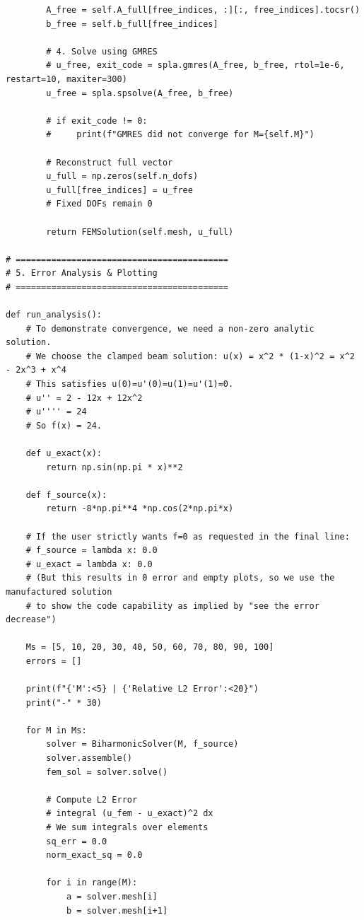 \documentclass{hw-template}
\begin{document}
\begin{verbatim}
        A_free = self.A_full[free_indices, :][:, free_indices].tocsr()
        b_free = self.b_full[free_indices]
        
        # 4. Solve using GMRES
        # u_free, exit_code = spla.gmres(A_free, b_free, rtol=1e-6, restart=10, maxiter=300)
        u_free = spla.spsolve(A_free, b_free)
        
        # if exit_code != 0:
        #     print(f"GMRES did not converge for M={self.M}")
            
        # Reconstruct full vector
        u_full = np.zeros(self.n_dofs)
        u_full[free_indices] = u_free
        # Fixed DOFs remain 0
        
        return FEMSolution(self.mesh, u_full)

# ==========================================
# 5. Error Analysis & Plotting
# ==========================================

def run_analysis():
    # To demonstrate convergence, we need a non-zero analytic solution.
    # We choose the clamped beam solution: u(x) = x^2 * (1-x)^2 = x^2 - 2x^3 + x^4
    # This satisfies u(0)=u'(0)=u(1)=u'(1)=0.
    # u'' = 2 - 12x + 12x^2
    # u'''' = 24
    # So f(x) = 24.
    
    def u_exact(x):
        return np.sin(np.pi * x)**2
    
    def f_source(x):
        return -8*np.pi**4 *np.cos(2*np.pi*x)
    
    # If the user strictly wants f=0 as requested in the final line:
    # f_source = lambda x: 0.0
    # u_exact = lambda x: 0.0
    # (But this results in 0 error and empty plots, so we use the manufactured solution
    # to show the code capability as implied by "see the error decrease")
    
    Ms = [5, 10, 20, 30, 40, 50, 60, 70, 80, 90, 100]
    errors = []
    
    print(f"{'M':<5} | {'Relative L2 Error':<20}")
    print("-" * 30)
    
    for M in Ms:
        solver = BiharmonicSolver(M, f_source)
        solver.assemble()
        fem_sol = solver.solve()
        
        # Compute L2 Error
        # integral (u_fem - u_exact)^2 dx
        # We sum integrals over elements
        sq_err = 0.0
        norm_exact_sq = 0.0
        
        for i in range(M):
            a = solver.mesh[i]
            b = solver.mesh[i+1]
            

\end{verbatim}
\end{document}
